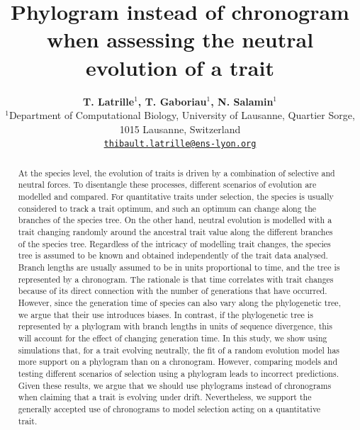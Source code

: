 \documentclass{article}
\title{Phylogram instead of chronogram when assessing the neutral evolution of a trait}
\author{
\large
\textbf{T. {Latrille}$^{1}$\orcidlink{0000-0002-9643-4668}, T. {Gaboriau}$^{1}$\orcidlink{0000-0001-7530-2204}, N. {Salamin}$^{1}$\orcidlink{0000-0002-3963-4954}}\\
\normalsize
$^{1}$Department of Computational Biology, University of Lausanne, Quartier Sorge, 1015 Lausanne, Switzerland\\
\texttt{\href{mailto:thibault.latrille@ens-lyon.org}{thibault.latrille@ens-lyon.org}} \\
}
\begin{document}
\maketitle

\begin{abstract}
At the species level, the evolution of traits is driven by a combination of selective and neutral forces. To disentangle these processes, different scenarios of evolution are modelled and compared. For quantitative traits under selection, the species is usually considered to track a trait optimum, and such an optimum can change along the branches of the species tree. On the other hand, neutral evolution is modelled with a trait changing randomly around the ancestral trait value along the different branches of the species tree. Regardless of the intricacy of modelling trait changes, the species tree is assumed to be known and obtained independently of the trait data analysed. Branch lengths are usually assumed to be in units proportional to time, and the tree is represented by a chronogram. The rationale is that time correlates with trait changes because of its direct connection with the number of generations that have occurred. However, since the generation time of species can also vary along the phylogenetic tree, we argue that their use introduces biases. In contrast, if the phylogenetic tree is represented by a phylogram with branch lengths in units of sequence divergence, this will account for the effect of changing generation time. In this study, we show using simulations that, for a trait evolving neutrally, the fit of a random evolution model has more support on a phylogram than on a chronogram. However, comparing models and testing different scenarios of selection using a phylogram leads to incorrect predictions. Given these results, we argue that we should use phylograms instead of chronograms when claiming that a trait is evolving under drift. Nevertheless, we support the generally accepted use of chronograms to model selection acting on a quantitative trait.
\end{abstract}


\newpage
\end{document}
